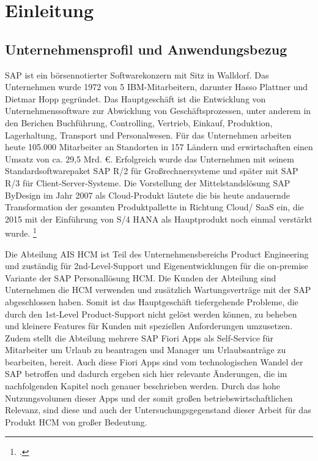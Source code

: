 \chapter{Einleitung}

\section{Unternehmensprofil und Anwendungsbezug}

SAP ist ein börsennotierter Softwarekonzern mit Sitz in Walldorf. Das Unternehmen wurde 1972 von 5 IBM-Mitarbeitern, darunter Hasso Plattner und Dietmar Hopp gegründet. Das Hauptgeschäft ist die Entwicklung von Unternehmenssoftware zur Abwicklung von Geschäftsprozessen, unter anderem in den Berichen Buchführung, Controlling, Vertrieb, Einkauf, Produktion, Lagerhaltung, Transport und Personalwesen. Für das Unternehmen arbeiten heute 105.000 Mitarbeiter an Standorten in 157 Ländern und erwirtschaften einen Umsatz von ca. 29,5 Mrd. \euro{}. Erfolgreich wurde das Unternehmen mit seinem Standardsoftwarepaket SAP R/2 für Gro{\ss}rechnersysteme und später mit SAP R/3 für Client-Server-Systeme. Die Vorstellung der Mittelstandslösung SAP ByDesign im Jahr 2007 als Cloud-Produkt läutete die bis heute andauernde Transformation der gesamten Produktpallette in Richtung Cloud/ SaaS ein, die 2015 mit der Einführung von S/4 HANA als Hauptprodukt noch einmal verstärkt wurde. \footcite[Vgl.][]{sap_geschichte_2023}

Die Abteilung AIS HCM ist Teil des Unternehmensbereichs Product Engineering und zuständig für 2nd-Level-Support und Eigenentwicklungen für die on-premise Variante der SAP Personallösung HCM. Die Kunden der Abteilung sind Unternehmen die HCM verwenden und zusätzlich Wartungsverträge mit der SAP abgeschlossen haben. Somit ist das Hauptgeschäft tiefergehende Probleme, die durch den 1st-Level Product-Support nicht gelöst werden können, zu beheben und kleinere Features für Kunden mit speziellen Anforderungen umzusetzen. Zudem stellt die Abteilung mehrere SAP Fiori Apps als Self-Service für Mitarbeiter \zB um Urlaub zu beantragen und Manager \zB um Urlaubsanträge zu bearbeiten, bereit. Auch diese Fiori Apps sind vom technologischen Wandel der SAP betroffen und dadurch ergeben sich hier relevante Änderungen, die im nachfolgenden Kapitel noch genauer beschrieben werden. Durch das hohe Nutzungsvolumen dieser Apps und der somit gro{\ss}en betriebswirtschaftlichen Relevanz, sind diese und auch der Untersuchungsgegenstand dieser Arbeit für das Produkt HCM von gro{\ss}er Bedeutung.

